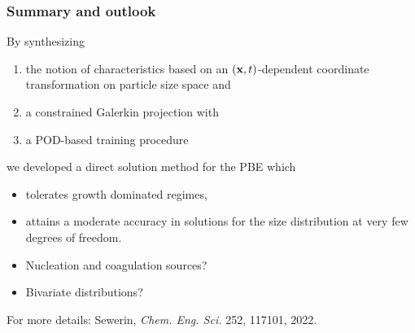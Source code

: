 \documentclass[10pt,xcolor=dvipsnames]{beamer}
\newcommand*{\itemskip}{0.25\baselineskip}
\begin{document}
\begin{frame}[t]
\end{frame}


\begin{frame}[t]

  \frametitle{Summary and outlook}

  \justifying By synthesizing
  \begin{enumerate}
  \vspace{\itemskip}
  \item the notion of characteristics based on an $({\mathbf x}, t)$-dependent coordinate transformation on particle size space and
  \vspace{\itemskip}
  \item a constrained Galerkin projection with
  \vspace{\itemskip}
  \item a POD-based training procedure
  \vspace{\itemskip}
  \end{enumerate}

  we developed a direct solution method for the PBE which

  \begin{itemize}
  \vspace{\itemskip}
  \item tolerates growth dominated regimes,
  \vspace{\itemskip}
  \item attains a moderate accuracy in solutions for the size distribution at very few degrees of freedom.
  \end{itemize}
  \vspace{0.5\baselineskip}

  \begin{itemize}
  \vspace{\itemskip}
  \item Nucleation and coagulation sources?
  \vspace{\itemskip}
  \item Bivariate distributions?
  \end{itemize}
  \vspace{0.5\baselineskip}

  \justifying For more details: Sewerin, \textit{Chem. Eng. Sci.} 252, 117101, 2022.

\end{frame}
\end{document}
